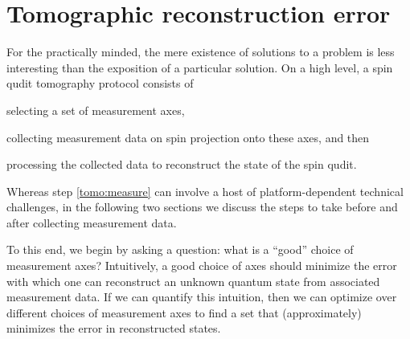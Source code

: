 \documentclass[notitlepage,twocolumn]{revtex4-2}
\begin{document}
\section{Tomographic reconstruction error}
\label{sec:error}

For the practically minded, the mere existence of solutions to a problem is less interesting than the exposition of a particular solution.
On a high level, a spin qudit tomography protocol consists of
\begin{enumerate*}
\item selecting a set of measurement axes,
\item collecting measurement data on spin projection onto these axes, and then
  \label{tomo:measure}
\item processing the collected data to reconstruct the state of the spin qudit.
\end{enumerate*}
Whereas step \ref{tomo:measure} can involve a host of platform-dependent technical challenges, in the following two sections we discuss the steps to take before and after collecting measurement data.

To this end, we begin by asking a question: what is a ``good'' choice of measurement axes?
Intuitively, a good choice of axes should minimize the error with which one can reconstruct an unknown quantum state from associated measurement data.
If we can quantify this intuition, then we can optimize over different choices of measurement axes to find a set that (approximately) minimizes the error in reconstructed states.
\end{document}
